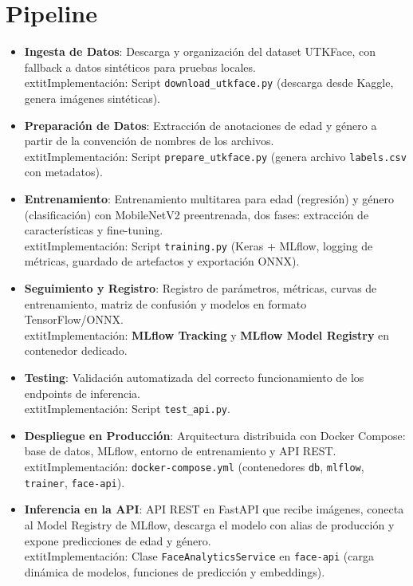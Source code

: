 \section{Pipeline}

\begin{itemize}
    \item \textbf{Ingesta de Datos}: Descarga y organización del dataset UTKFace, con fallback a datos sintéticos para pruebas locales.\\
    	extit{Implementación:} Script \texttt{download\_utkface.py} (descarga desde Kaggle, genera imágenes sintéticas).

    \item \textbf{Preparación de Datos}: Extracción de anotaciones de edad y género a partir de la convención de nombres de los archivos.\\
    	extit{Implementación:} Script \texttt{prepare\_utkface.py} (genera archivo \texttt{labels.csv} con metadatos).

    \item \textbf{Entrenamiento}: Entrenamiento multitarea para edad (regresión) y género (clasificación) con MobileNetV2 preentrenada, dos fases: extracción de características y fine-tuning.\\
    	extit{Implementación:} Script \texttt{training.py} (Keras + MLflow, logging de métricas, guardado de artefactos y exportación ONNX).

    \item \textbf{Seguimiento y Registro}: Registro de parámetros, métricas, curvas de entrenamiento, matriz de confusión y modelos en formato TensorFlow/ONNX.\\
    	extit{Implementación:} \textbf{MLflow Tracking} y \textbf{MLflow Model Registry} en contenedor dedicado.

    \item \textbf{Testing}: Validación automatizada del correcto funcionamiento de los endpoints de inferencia.\\
    	extit{Implementación:} Script \texttt{test\_api.py}.

    \item \textbf{Despliegue en Producción}: Arquitectura distribuida con Docker Compose: base de datos, MLflow, entorno de entrenamiento y API REST.\\
    	extit{Implementación:} \texttt{docker-compose.yml} (contenedores \texttt{db}, \texttt{mlflow}, \texttt{trainer}, \texttt{face-api}).

    \item \textbf{Inferencia en la API}: API REST en FastAPI que recibe imágenes, conecta al Model Registry de MLflow, descarga el modelo con alias de producción y expone predicciones de edad y género.\\
    	extit{Implementación:} Clase \texttt{FaceAnalyticsService} en \texttt{face-api} (carga dinámica de modelos, funciones de predicción y embeddings).
\end{itemize}
